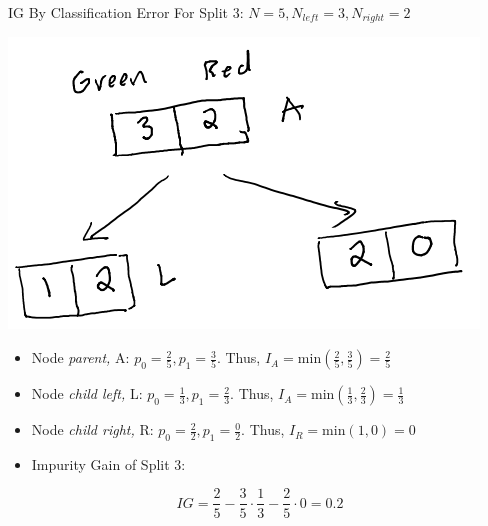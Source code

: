 \documentclass[
  ignorenonframetext,
]{beamer}
\begin{document}
\begin{frame}{IG By Classification Error}
\protect\hypertarget{ig-by-classification-error}{}
For Split 3: \(N = 5, N_{left} =3, N_{right} = 2\)

\includegraphics{images/im2.png}

\begin{itemize}
\item
  Node \emph{parent,} A: \(p_0 = \frac{2}{5}, p_1 = \frac{3}{5}\). Thus,
  \(I_{A} = \text{min}(\frac{2}{5}, \frac{3}{5}) = \frac{2}{5}\)
\item
  Node \emph{child left,} L: \(p_0 = \frac{1}{3}, p_1 = \frac{2}{3}\).
  Thus, \(I_{A} = \text{min}(\frac{1}{3}, \frac{2}{3}) = \frac{1}{3}\)
\item
  Node \emph{child right,} R: \(p_0 = \frac{2}{2}, p_1 = \frac{0}{2}\).
  Thus, \(I_{R} = \text{min}(1,0) = 0\)
\item
  Impurity Gain of Split 3:
\end{itemize}

\[IG = \frac{2}{5} - \frac{3}{5} \cdot \frac{1}{3}-\frac{2}{5} \cdot 0 = 0.2\]


\end{frame}
\end{document}
